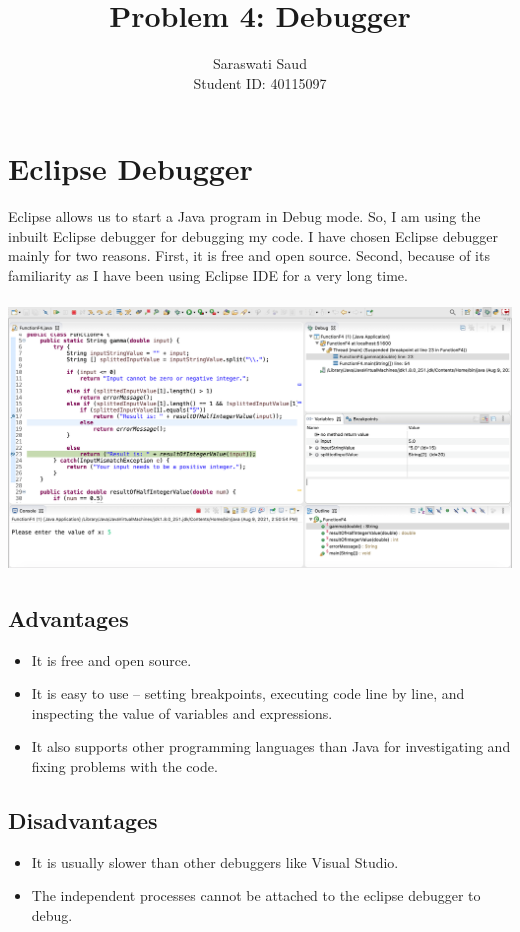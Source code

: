 \documentclass[a4paper,12pt]{article}
\title{Problem 4: Debugger}
\author{Saraswati Saud \\
Student ID: 40115097}
\date{}
\begin{document}
\maketitle
\section{Eclipse Debugger}
    Eclipse allows us to start a Java program in Debug mode. So, I am using the inbuilt Eclipse debugger for debugging my code. I have chosen Eclipse debugger mainly for two reasons. First, it is free and open source. Second, because of its familiarity as I have been using Eclipse IDE for a very long time.\\ \\
    \includegraphics[width=16cm, height=7cm]{debugger.png}
    \subsection{Advantages}
    \begin{itemize}
        \item It is free and open source.
        \item It is easy to use – setting breakpoints, executing code line by line, and inspecting the value of variables and expressions.
        \item It also supports other programming languages than Java for investigating and fixing problems with the code.
    \end{itemize}
    
    \subsection{Disadvantages}
    \begin{itemize}
        \item It is usually slower than other debuggers like Visual Studio.
        \item The independent processes cannot be attached to the eclipse debugger to debug.
    \end{itemize}
\end{document}
